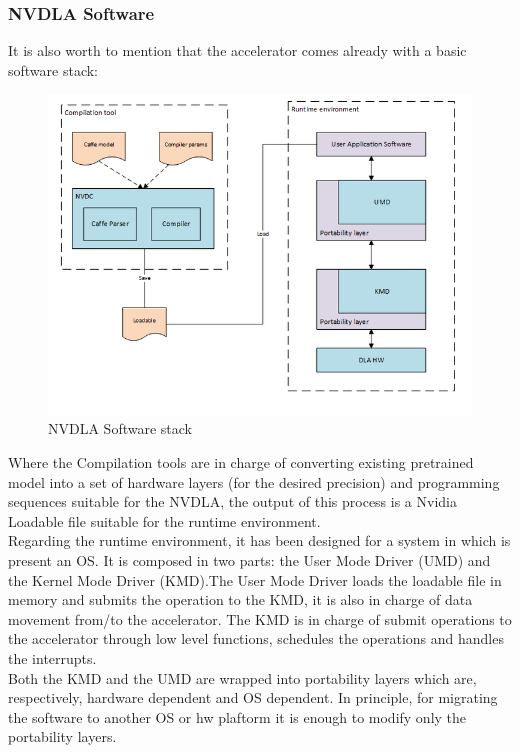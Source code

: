 \subsubsection{ NVDLA Software }
It is also worth to mention that the accelerator comes already with a basic software stack:
\begin{figure}[H]
\centering
\captionsetup{justification=centering}
\includegraphics[scale=0.8]{./figure/nvdla_software.PNG}
\caption{NVDLA Software stack\cite{WEBSITE:7}}
\label{fig:nvdlasw}
\end{figure}

Where the Compilation tools are in charge of converting existing pretrained model into a set of hardware layers (for the desired precision) and programming sequences suitable for the NVDLA, the output of this process is a Nvidia Loadable file suitable for the runtime environment.\\
Regarding the runtime environment, it has been designed for a system in which is present an OS. It is composed in two parts: the User Mode Driver (UMD) and the Kernel Mode Driver (KMD).\newline The User Mode Driver loads the loadable file in memory and submits the operation to the KMD, it is also in charge of data movement from/to the accelerator. \newline The KMD is in charge of submit operations to the accelerator through low level functions, schedules the operations and handles the interrupts.\\
Both the KMD and the UMD are wrapped into portability layers which are, respectively, hardware dependent and OS dependent. In principle, for migrating the software to another OS or hw plaftorm it is enough to modify only the portability layers.
\newpage
